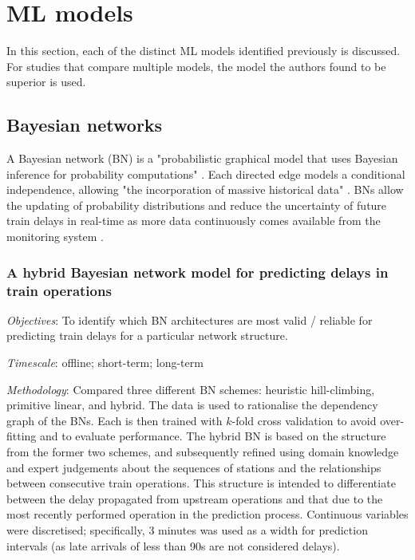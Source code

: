\documentclass{article}
\begin{document}
\section{ML models}

In this section, each of the distinct ML models identified previously is discussed. For studies that compare multiple models, the model the authors found to be superior is used. 


\subsection{Bayesian networks}

A Bayesian network (BN) is a "probabilistic graphical model that uses Bayesian inference for probability computations" \cite{towards_data_science_BN_intro}. Each directed edge models a conditional independence, allowing "the incorporation of massive historical data" \cite{lessan_fu_wen_2019}. BNs allow the updating of probability distributions and reduce the uncertainty of future train delays in real-time as more data continuously comes available from the monitoring system \cite{corman_kecman_2018}.


\subsubsection{A hybrid Bayesian network model for predicting delays in train operations \cite{lessan_fu_wen_2019}}

\textit{Objectives}: To identify which BN architectures are most valid / reliable for predicting train delays for a particular network structure.

\smallskip

\textit{Timescale}: offline; short-term; long-term

\smallskip

\textit{Methodology}: Compared three different BN schemes: heuristic hill-climbing, primitive linear, and hybrid. The data is used to rationalise the dependency graph of the BNs. Each is then trained with $k$-fold cross validation to avoid over-fitting and to evaluate performance. The hybrid BN is based on the structure from the former two schemes, and subsequently refined using domain knowledge and expert judgements about the sequences of stations and the relationships between consecutive train operations. This structure is intended to differentiate between the delay propagated from upstream operations and that due to the most recently performed operation in the prediction process. Continuous variables were discretised; specifically, 3 minutes was used as a width for prediction intervals (as late arrivals of less than 90s are not considered delays).
\end{document}
